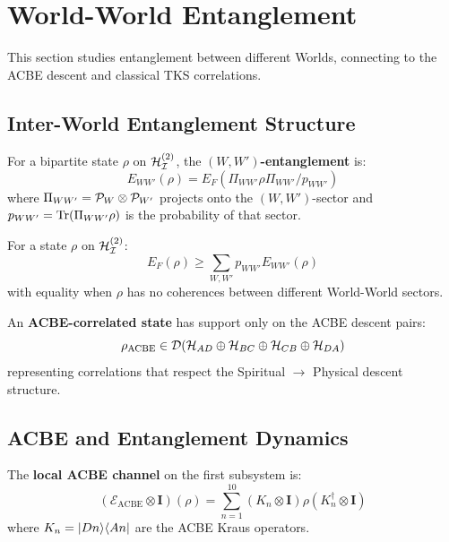 \section{World-World Entanglement}
\label{sec:entanglement-acquisition}

This section studies entanglement between different Worlds, connecting to the ACBE descent and classical TKS correlations.

\subsection{Inter-World Entanglement Structure}

\begin{definition}
\label{def:inter-world-entanglement}
For a bipartite state $\rho$ on $\mathcal{H}_{\mathcal{I}}^{(2)}$, the \textbf{$(W, W')$-entanglement} is:
\[
E_{WW'}(\rho) = E_F(\Pi_{WW'} \rho \Pi_{WW'} / p_{WW'})
\]
where $\Pi_{WW'} = \mathcal{P}_W \otimes \mathcal{P}_{W'}$ projects onto the $(W, W')$-sector and $p_{WW'} = \mathrm{Tr}(\Pi_{WW'} \rho)$ is the probability of that sector.
\end{definition}

\begin{proposition}
\label{prop:world-entanglement-decomp}
For a state $\rho$ on $\mathcal{H}_{\mathcal{I}}^{(2)}$:
\[
E_F(\rho) \geq \sum_{W, W'} p_{WW'} E_{WW'}(\rho)
\]
with equality when $\rho$ has no coherences between different World-World sectors.
\end{proposition}

\begin{definition}
\label{def:acbe-correlated}
An \textbf{ACBE-correlated state} has support only on the ACBE descent pairs:
\[
\rho_{\mathrm{ACBE}} \in \mathcal{D}(\mathcal{H}_{AD} \oplus \mathcal{H}_{BC} \oplus \mathcal{H}_{CB} \oplus \mathcal{H}_{DA})
\]
representing correlations that respect the Spiritual $\to$ Physical descent structure.
\end{definition}

\subsection{ACBE and Entanglement Dynamics}

\begin{definition}
\label{def:local-acbe}
The \textbf{local ACBE channel} on the first subsystem is:
\[
(\mathcal{E}_{\mathrm{ACBE}} \otimes \mathbf{I})(\rho) = \sum_{n=1}^{10} (K_n \otimes \mathbf{I}) \rho (K_n^\dagger \otimes \mathbf{I})
\]
where $K_n = |Dn\rangle\langle An|$ are the ACBE Kraus operators.
\end{definition}

